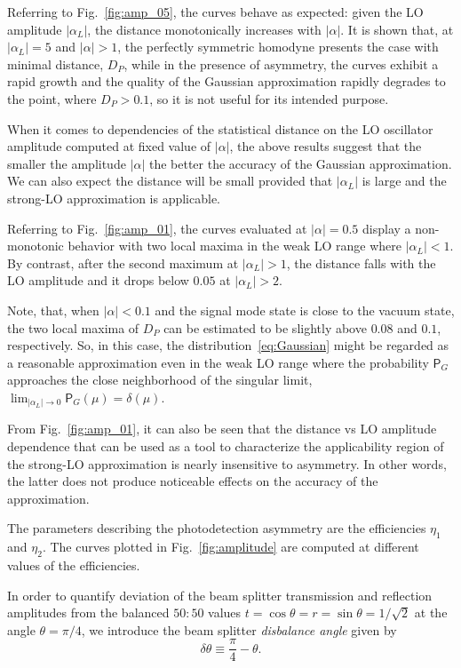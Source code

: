 \documentclass[%
reprint,
superscriptaddress,
 amsmath,amssymb,amsfonts,
 aps,
 pra,
 longbibliography
]{revtex4-2}
\newcommand{\prob}{\mathsf{P}}
\begin{document}
Referring to Fig.~\ref{fig:amp_05},
the curves behave as expected:
given the LO amplitude $|\alpha_L|$,
the distance monotonically increases with $|\alpha|$.
It is shown that,
at $|\alpha_L|=5$ and $|\alpha|>1$,
the perfectly symmetric homodyne presents the case
with minimal distance, $D_P$, while in the presence of asymmetry,
the curves exhibit a rapid growth and
the quality of  the Gaussian approximation
rapidly degrades to the point, where $D_P>0.1$,
so it is not useful for its intended purpose.

When it comes to dependencies of the statistical distance on
the LO oscillator amplitude
computed at fixed value of $|\alpha|$,
the above results suggest that the smaller the amplitude $|\alpha|$
the better the accuracy of the Gaussian approximation.
We can also expect the distance
will be small provided that $|\alpha_L|$ is large
and the strong-LO approximation is applicable. 


Referring to Fig.~\ref{fig:amp_01},
the curves evaluated at $|\alpha|=0.5$
display a non-monotonic behavior with two local maxima
in the weak LO range where $|\alpha_L|<1$.
By contrast, after the second maximum at $|\alpha_L|>1$,
the distance falls with the LO amplitude
and it drops below $0.05$ at $|\alpha_L|>2$.

Note, that, when $|\alpha|<0.1$
and the signal mode state is close to the vacuum state,
the two local maxima of $D_P$ can be estimated to be slightly above $0.08$ and $0.1$,
respectively. So, in this case, the distribution~\eqref{eq:Gaussian}
might be regarded as a reasonable approximation even in the
weak LO range where
the probability $\prob_G$ approaches the close neighborhood of
the singular limit,
$\lim_{|\alpha_L|\to 0}\prob_G(\mu)=\delta(\mu)$. 


From Fig.~\ref{fig:amp_01},
it can also be seen that
the distance vs LO amplitude dependence
that can be used as a tool to characterize
the applicability region of the strong-LO approximation
is nearly insensitive to asymmetry.
In other words, the latter does not produce noticeable effects on
the accuracy of the approximation.


The parameters describing
the photodetection asymmetry are
the efficiencies $\eta_1$ and $\eta_2$.
The curves plotted in Fig.~\ref{fig:amplitude}
are computed at different values of the efficiencies.

In order to quantify deviation of the beam splitter
transmission and reflection amplitudes
from the balanced $50:50$ values
$t=\cos\theta=r=\sin\theta=1/\sqrt{2}$ at
the angle $\theta=\pi/4$,
we introduce the beam splitter \textit{disbalance angle} given by
\begin{equation}
  \label{eq:delta-theta}
        \delta\theta\equiv\frac{\pi}{4}-\theta.
      \end{equation}
\end{document}
